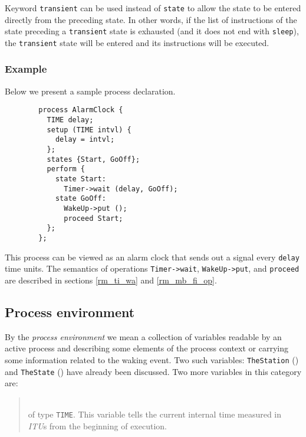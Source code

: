 Keyword {\tt transient} can be used instead of {\tt state} to allow the
state to be entered directly from the preceding state.
In other words, if the list of instructions of the state preceding a
{\tt transient} state is exhausted (and it does not end with
{\tt sleep}), the {\tt transient} state will be entered and its
instructions will be executed.

\subsubsection*{Example}

\noindent
Below we present a sample process declaration.
\begin{verbatim}
        process AlarmClock {
          TIME delay;
          setup (TIME intvl) {
            delay = intvl;
          };
          states {Start, GoOff};
          perform {
            state Start:
              Timer->wait (delay, GoOff);
            state GoOff:
              WakeUp->put ();
              proceed Start;
          };
        };
\end{verbatim}

This process can be viewed as an alarm clock that sends out a signal
every {\tt delay} time units.
The semantics of operations {\tt Timer->wait}, {\tt WakeUp->put}, and
{\tt proceed} are described in sections \ref{rm_ti_wa} and \ref{rm_mb_fi_op}.

\subsection{Process environment}
\label{rm_pr_en}

By the {\em process environment\/} we mean a collection of variables
readable by an active process and describing some elements of the
process context or carrying some information related to the waking
event.
Two such variables: {\tt TheStation} () and
{\tt TheState} () have already been discussed.
Two more variables in this category are:

\medskip

\begin{quote}
\noindent{}\\ \hspace{0in}
of type {\tt TIME}.
This variable
tells the current internal time measured in {\em ITU\/}s from the
beginning of execution.
\end{quote}

